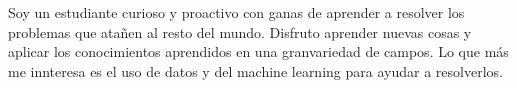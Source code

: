 

Soy un estudiante curioso y proactivo con ganas de aprender a resolver los problemas que atañen al resto del mundo. Disfruto aprender nuevas cosas y aplicar los conocimientos aprendidos en una granvariedad de campos. Lo que más me innteresa es el uso de datos y del machine learning para ayudar a resolverlos.